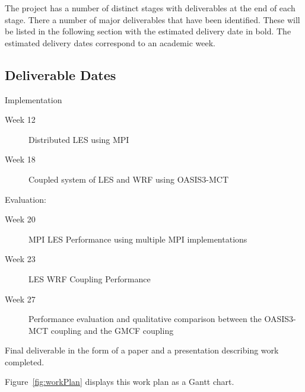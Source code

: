 The project has a number of distinct stages with deliverables at the end of each
stage. There a number of major deliverables that have been identified. These
will be listed in the following section with the estimated delivery date in
bold. The estimated delivery dates correspond to an academic week.

\subsection{Deliverable Dates}

\begin{description}
    \item
    \item[Week 18] Implementation
    \begin{description}
        \item[Week 12] Distributed LES using MPI
        \item[Week 18] Coupled system of LES and WRF using OASIS3-MCT
    \end{description}
    \item[Week 27] Evaluation:
    \begin{description}
        \item[Week 20] MPI LES Performance using multiple MPI implementations
        \item[Week 23] LES WRF Coupling Performance
        \item[Week 27] Performance evaluation and qualitative comparison between
        the OASIS3-MCT coupling and the GMCF coupling
    \end{description}
    \item[Week 31] Final deliverable in the form of a paper and a presentation
    describing work completed.
\end{description}

Figure~\ref{fig:workPlan} displays this work plan as a Gantt chart.


